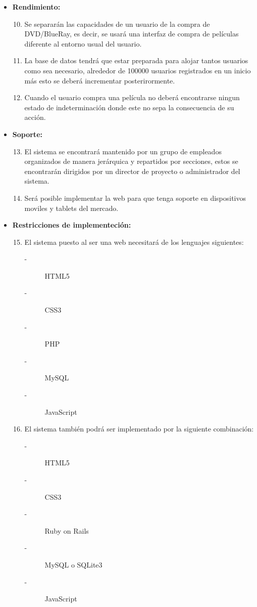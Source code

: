 \documentclass{article}
\begin{document}
\begin{itemize}
    \item \textbf{Rendimiento:}
        \begin{enumerate}[label=\bfseries RNF- \arabic*:]
        \setcounter{enumi}{9}
        \item Se separarán las capacidades de un usuario de la compra de DVD/BlueRay, es decir, se usará una interfaz de compra de películas diferente al entorno usual del usuario.
        \item La base de datos tendrá que estar preparada para alojar tantos usuarios como sea necesario, alrededor de 100000 usuarios registrados en un inicio más esto se deberá incrementar posterirormente.
        \item Cuando el usuario compra una película no deberá encontrarse ningun estado de indeterminación donde este no sepa la consecuencia de su acción.
        \end{enumerate}
        
    \item \textbf{Soporte:}
        \begin{enumerate}[label=\bfseries RNF- \arabic*:]
        \setcounter{enumi}{12}
        \item El sistema se encontrará mantenido por un grupo de empleados organizados de manera jerárquica y repartidos por secciones, estos se encontrarán dirigidos por un director de proyecto o administrador del sistema.
        \item Será posible implementar la web para que tenga soporte en dispositivos moviles y tablets del mercado.
        \end{enumerate}
        
    \item \textbf{Restricciones de implementeción:}
        \begin{enumerate}[label=\bfseries RNF- \arabic*:]
        \setcounter{enumi}{14}
        \item El sistema puesto al ser una web necesitará de los lenguajes siguientes:
            \begin{description}
            \item[-] HTML5
            \item[-] CSS3
            \item[-] PHP
            \item[-] MySQL
            \item[-] JavaScript
            \end{description}
        \item El sistema también podrá ser implementado por la siguiente combinación:
            \begin{description}
            \item[-] HTML5
            \item[-] CSS3
            \item[-] Ruby on Rails
            \item[-] MySQL o SQLite3
            \item[-] JavaScript
            \end{description}
        \end{enumerate}
        

\end{itemize}
\end{document}
